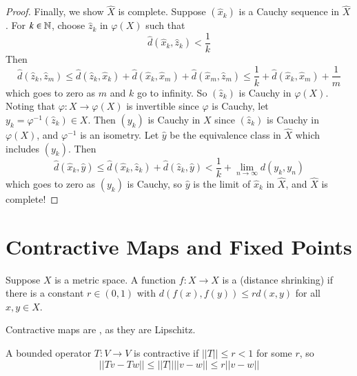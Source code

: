 \begin{proof}
    Finally, we show $\hat{X}$ is complete. Suppose $(\hat{x}_k)$ is a Cauchy sequence in $\hat{X}$. For $k \in \mathbb N$, choose $\hat{z}_k$ in $\varphi(X)$ such that $$\hat{d}(\hat{x}_k,\hat{z}_k) < \frac{1}{k}$$ Then $$\hat{d}(\hat{z}_k,\hat{z}_m) \leq \hat{d}(\hat{z}_k,\hat{x}_k)+\hat{d}(\hat{x}_k,\hat{x}_m)+\hat{d}(\hat{x}_m,\hat{z}_m) \leq \frac{1}{k} + \hat{d}(\hat{x}_k,\hat{x}_m) + \frac{1}{m}$$ which goes to zero as $m$ and $k$ go to infinity. So $(\hat{z}_k)$ is Cauchy in $\varphi(X)$. Noting that $\varphi:X\rightarrow \varphi(X)$ is invertible since $\varphi$ is Cauchy, let $y_k = \varphi^{-1}(\hat{z}_k) \in X$. Then $(y_k)$ is Cauchy in $X$ since $(\hat{z}_k)$ is Cauchy in $\varphi(X)$, and $\varphi^{-1}$ is an isometry. Let $\hat{y}$ be the equivalence class in $\hat{X}$ which includes $(y_k)$. Then $$\hat{d}(\hat{x}_k,\hat{y}) \leq \hat{d}(\hat{x}_k,\hat{z}_k) + \hat{d}(\hat{z}_k,\hat{y}) < \frac{1}{k} + \lim\limits_{n\rightarrow \infty}d(y_k,y_n)$$ which goes to zero as $(y_k)$ is Cauchy, so $\hat{y}$ is the limit of $\hat{x}_k$ in $\hat{X}$, and $\hat{X}$ is complete!
\end{proof}

\section{Contractive Maps and Fixed Points}

\begin{defn}
    Suppose $X$ is a metric space. A function $f:X\rightarrow X$ is a  (distance shrinking) if there is a constant $r \in (0,1)$ with $d(f(x),f(y)) \leq rd(x,y)$ for all $x,y \in X$.
\end{defn}

Contractive maps are , as they are Lipschitz.

\begin{eg}
    A bounded operator $T:V\rightarrow V$ is contractive if $||T|| \leq r < 1$ for some $r$, so $$||Tv-Tw|| \leq ||T||||v-w|| \leq r||v-w||$$
\end{eg}

